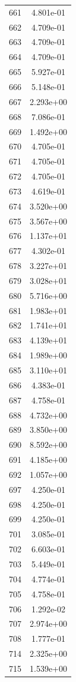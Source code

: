 \documentclass[12pt]{article}
\begin{document}
\begin{longtable}{@{}cc@{}}
661 & 4.801e-01 \\
662 & 4.709e-01 \\
663 & 4.709e-01 \\
664 & 4.709e-01 \\
665 & 5.927e-01 \\
666 & 5.148e-01 \\
667 & 2.293e+00 \\
668 & 7.086e-01 \\
669 & 1.492e+00 \\
670 & 4.705e-01 \\
671 & 4.705e-01 \\
672 & 4.705e-01 \\
673 & 4.619e-01 \\
674 & 3.520e+00 \\
675 & 3.567e+00 \\
676 & 1.137e+01 \\
677 & 4.302e-01 \\
678 & 3.227e+01 \\
679 & 3.028e+01 \\
680 & 5.716e+00 \\
681 & 1.983e+01 \\
682 & 1.741e+01 \\
683 & 4.139e+01 \\
684 & 1.989e+00 \\
685 & 3.110e+01 \\
686 & 4.383e-01 \\
687 & 4.758e-01 \\
688 & 4.732e+00 \\
689 & 3.850e+00 \\
690 & 8.592e+00 \\
691 & 4.185e+00 \\
692 & 1.057e+00 \\
697 & 4.250e-01 \\
698 & 4.250e-01 \\
699 & 4.250e-01 \\
701 & 3.085e-01 \\
702 & 6.603e-01 \\
703 & 5.449e-01 \\
704 & 4.774e-01 \\
705 & 4.758e-01 \\
706 & 1.292e-02 \\
707 & 2.974e+00 \\
708 & 1.777e-01 \\
714 & 2.325e+00 \\
715 & 1.539e+00 \\

\end{longtable}
\end{document}
